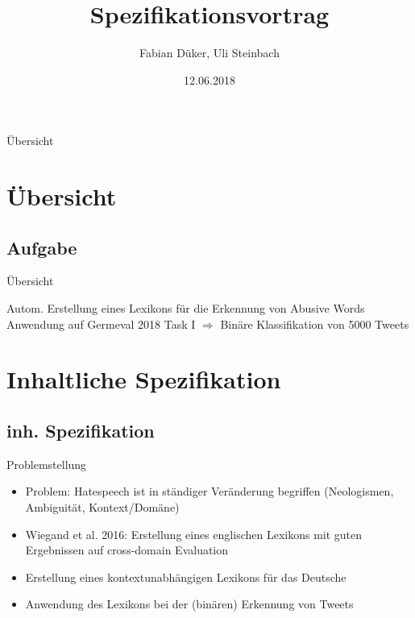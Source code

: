 \documentclass{beamer}
\begin{document}
\title[]{Spezifikationsvortrag}
\author[]{Fabian Düker, Uli Steinbach}
\date{12.06.2018}

\frame{\titlepage}
\begin{frame}[allowframebreaks]{Übersicht}
\tableofcontents
\end{frame}



\section{Übersicht}

\subsection[Aufgabe]{Aufgabe }

\begin{frame}{Übersicht}
\begin{block}{Autom. Erstellung eines Lexikons für die Erkennung von Abusive Words }
Anwendung auf Germeval 2018 Task I $\Rightarrow$ Binäre Klassifikation von 5000 Tweets 
\end{block}
\end{frame}


\section{Inhaltliche Spezifikation}
\subsection[inh. Spez.]{ inh. Spezifikation }

\begin{frame}{Problemstellung}
\begin{itemize}
	\item Problem: Hatespeech ist in ständiger Veränderung begriffen (Neologismen, Ambiguität, Kontext/Domäne)
	\item Wiegand et al. 2016: Erstellung eines englischen Lexikons mit guten Ergebnissen auf cross-domain Evaluation
	\item Erstellung eines kontextunabhängigen Lexikons für das Deutsche
	\item Anwendung des Lexikons bei der (binären) Erkennung von Tweets

\end{itemize}
\end{frame}
\end{document}

